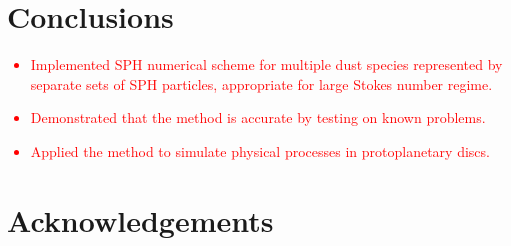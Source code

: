 \documentclass[fleqn,usenatbib]{mnras}
\begin{document}
\section{Conclusions}

\textcolor{red}{
\begin{itemize}
   \item Implemented SPH numerical scheme for multiple dust species represented
      by separate sets of SPH particles, appropriate for large Stokes number
      regime.
   \item Demonstrated that the method is accurate by testing on known problems.
   \item Applied the method to simulate physical processes in protoplanetary
      discs.
\end{itemize}
}

\section*{Acknowledgements}
















\bsp %
\label{lastpage}
\end{document}

